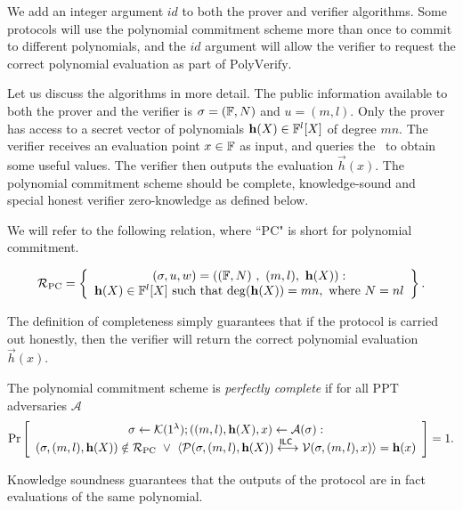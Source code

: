 We add an integer argument $id$ to both the prover and verifier algorithms. Some protocols will use the polynomial commitment scheme more than once to commit to different polynomials, and the $id$ argument will allow the verifier to request the correct polynomial evaluation as part of $\mathrm{PolyVerify}$.

Let us discuss the algorithms in more detail. The public information available to both the prover and the verifier is $\mathsf{\sigma} = (\mathbb{F},N)$ and $u = (m,l)$. Only the prover has access to a secret vector of polynomials $\mathbf{h}(X) \in \mathbb{F}^l[X]$ of degree $mn$. The verifier receives an evaluation point $x \in \mathbb{F}$ as input, and queries the \ILC\ to obtain some useful values. The verifier then outputs the evaluation $\vec{h}(x)$. The polynomial commitment scheme should be complete, knowledge-sound and special honest verifier zero-knowledge as defined below.

We will refer to the following relation, where ``PC" is short for polynomial commitment.

$$\mathcal{R}_{\textnormal{PC}}=\left\{\begin{array}{c}
(\mathsf{\sigma},u,w)=\left( (\mathbb{F},N)\ , \  (m,l) , \ \mathbf{h}(X) \right):\\
\mathbf{h}(X) \in \mathbb{F}^l[X] \text{ such that } \mathrm{deg}(\mathbf{h}(X)) = mn, \text{ where } N = nl
\end{array}\right\}.$$

The definition of completeness simply guarantees that if the protocol is carried out honestly, then the verifier will return the correct polynomial evaluation $\vec{h}(x)$.

\begin{definition}
The polynomial commitment scheme is \emph{perfectly complete} if for all PPT adversaries $\mathcal{A}$
$$\Pr \left[ \begin{array}{c} \mathsf{\sigma}\gets \mathcal{K}(1^{\lambda}); ((m,l),\mathbf{h}(X),x) \leftarrow \mathcal{A}(\mathsf{\sigma}): \\
(\mathsf{\sigma},(m,l),\mathbf{h}(X))\notin \mathcal{R}_\mathrm{PC} ~\vee~ \langle \mathcal{P}(\mathsf{\sigma},(m,l),\mathbf{h}(X))\overset{\mathsf{ILC}~}{\longleftrightarrow}\mathcal{V}(\mathsf{\sigma},(m,l),x)\rangle= \mathbf{h}(x) \end{array}\right] =1.$$
\end{definition}

Knowledge soundness guarantees that the outputs of the protocol are in fact evaluations of the same polynomial.

